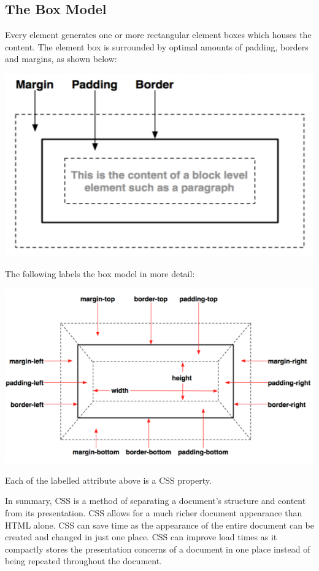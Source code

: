 \documentclass[a4paper, openany]{memoir}
\begin{document}
\subsection{The Box Model}
Every element generates one or more rectangular element boxes which houses the content. The element box is surrounded by optimal amounts of padding, borders and margins, as shown below:
\begin{center}
    \includegraphics[scale=0.8]{src/L11I1.PNG}
\end{center}
The following labels the box model in more detail:
\begin{center}
    \includegraphics[scale=0.8]{src/L11I2.PNG}
\end{center}
Each of the labelled attribute above is a CSS property.

In summary, CSS is a method of separating a document's structure and content from its presentation. CSS allows for a much richer document appearance than HTML alone. CSS can save time as the appearance of the entire document can be created and changed in just one place. CSS can improve load times as it compactly stores the presentation concerns of a document in one place instead of being repeated throughout the document.
\end{document}
